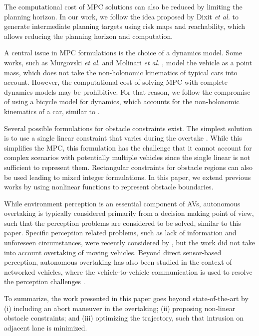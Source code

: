 \documentclass[letterpaper, 10 pt, conference]{ieeeconf}
\begin{document}
The computational cost of MPC solutions can also be reduced by limiting the planning horizon. In our work, we follow the idea proposed by Dixit \textit{et al.} \cite{dixitTrajectoryPlanningTracking2018} to generate intermediate planning targets using risk maps and reachability, which allows reducing the planning horizon and computation. 

A central issue in MPC formulations is the choice of a dynamics model. Some works, such as 
Murgovski \textit{et al.} \cite{murgovskiPredictiveCruiseControl2015} and Molinari \textit{et al.} \cite{molinariEfficientMixedInteger2017}, model the vehicle as a point mass, which does not take the non-holonomic kinematics of typical cars into account. However, the computational cost of solving MPC with complete dynamics models may be prohibitive. For that reason, we follow the compromise of using a bicycle model for dynamics, which accounts for the non-holonomic kinematics of a car, similar to \cite{dixitTrajectoryPlanningTracking2018}.

Several possible formulations for obstacle constraints exist. 
The simplest solution is to use a single linear constraint that varies during the overtake \cite{dixitTrajectoryPlanningTracking2018}. 
While this simplifies the MPC, this formulation has the challenge that it cannot account for complex scenarios with potentially multiple vehicles since the single linear is not sufficient to represent them.
Rectangular constraints for obstacle regions can also be used \cite{molinariEfficientMixedInteger2017} leading to mixed integer formulations. 
In this paper, we extend previous works by using nonlinear functions to represent obstacle boundaries.

While environment perception is an essential component of AVs, autonomous overtaking is typically considered primarily from a decision making point of view, such that the perception problems are considered to be solved, similar to this paper. Specific perception related problems, such as lack of information and unforeseen circumstances, were recently considered by \cite{andersenTrajectoryOptimizationSituational2020}, but the work did not take into account overtaking of moving vehicles. 
Beyond direct sensor-based perception, autonomous overtaking has also been studied in the context of networked vehicles, where the vehicle-to-vehicle communication is used to resolve the perception challenges
\cite{lattarulo2021}.

To summarize, the work presented in this paper goes beyond state-of-the-art by (i) including an abort maneuver in the overtaking; (ii) proposing non-linear obstacle constraints; and (iii) optimizing the trajectory, such that intrusion on adjacent lane is minimized.
\end{document}

